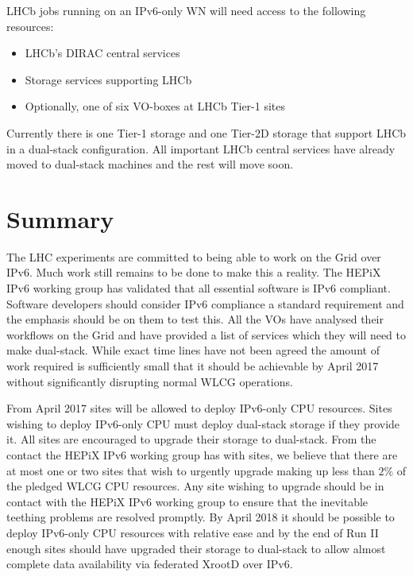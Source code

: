 \documentclass[a4paper]{jpconf}
\begin{document}
LHCb jobs running on an IPv6-only WN will need access to the following
resources:
\begin{itemize}
\item LHCb's DIRAC central services
\item Storage services supporting LHCb
\item Optionally, one of six VO-boxes at LHCb Tier-1 sites
\end{itemize}
Currently there is one Tier-1 storage and one Tier-2D storage that
support LHCb in a dual-stack configuration.  All important LHCb central services have already moved to dual-stack machines and the rest will move soon.

\section{Summary}
The LHC experiments are committed to being able to work on the Grid over IPv6.
Much work still remains to be done to make this a reality.  The HEPiX
IPv6 working group has validated that all essential software is IPv6
compliant.  Software developers should consider IPv6 compliance a
standard requirement and the emphasis should be on them to test this.
All the VOs have analysed their workflows on the Grid and have
provided a list of services which they will need to make dual-stack.
While exact time lines have not been agreed the amount of work
required is sufficiently small that it should be achievable by April
2017 without significantly disrupting normal WLCG operations.

From April 2017 sites will be allowed to deploy IPv6-only CPU
resources. Sites wishing to deploy IPv6-only CPU must deploy
dual-stack storage if they provide it.  All sites are encouraged to
upgrade their storage to dual-stack.  From the contact the HEPiX IPv6
working group has with sites, we believe that there are at most one or
two sites that wish to urgently upgrade making up less than $2\%$ of
the pledged WLCG CPU resources.  Any site wishing to upgrade should be
in contact with the HEPiX IPv6 working group to ensure that the
inevitable teething problems are resolved promptly.  By April 2018 it
should be possible to deploy IPv6-only CPU resources with relative
ease and by the end of Run II enough sites should have upgraded their
storage to dual-stack to allow almost complete data availability via
federated XrootD over IPv6.
\end{document}
